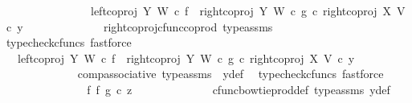 \begin{isabellebody}
\ \ \ \ \ \ \ \ \ \ \ \ \ \ \ \ {\isacharparenleft}{\kern0pt}{\isacharparenleft}{\kern0pt}{\isacharparenleft}{\kern0pt}left{\isacharunderscore}{\kern0pt}coproj\ Y\ W\ {\isasymcirc}\isactrlsub c\ f{\isacharparenright}{\kern0pt}\ {\isasymamalg}\ {\isacharparenleft}{\kern0pt}right{\isacharunderscore}{\kern0pt}coproj\ Y\ W\ {\isasymcirc}\isactrlsub c\ g{\isacharparenright}{\kern0pt}{\isacharparenright}{\kern0pt}\ {\isasymcirc}\isactrlsub c\ right{\isacharunderscore}{\kern0pt}coproj\ X\ V{\isacharparenright}{\kern0pt}\ {\isasymcirc}\isactrlsub c\ y{}{\isachardoublequoteclose}\isanewline
\ \ \ \ \ \ \ \ \ \ \ \ \isamarkupfalse%
\ right{\isacharunderscore}{\kern0pt}coproj{\isacharunderscore}{\kern0pt}cfunc{\isacharunderscore}{\kern0pt}coprod\ type{\isacharunderscore}{\kern0pt}assms\ \isamarkupfalse%
\ {\isacharparenleft}{\kern0pt}typecheck{\isacharunderscore}{\kern0pt}cfuncs{\isacharcomma}{\kern0pt}\ fastforce{\isacharparenright}{\kern0pt}\isanewline
\ \ \ \ \ \ \ \ \ \ \isamarkupfalse%
\ \isamarkupfalse%
\ {\isachardoublequoteopen}{\isachardot}{\kern0pt}{\isachardot}{\kern0pt}{\isachardot}{\kern0pt}\ {\isacharequal}{\kern0pt}\ {\isacharparenleft}{\kern0pt}{\isacharparenleft}{\kern0pt}left{\isacharunderscore}{\kern0pt}coproj\ Y\ W\ {\isasymcirc}\isactrlsub c\ f{\isacharparenright}{\kern0pt}\ {\isasymamalg}\ {\isacharparenleft}{\kern0pt}right{\isacharunderscore}{\kern0pt}coproj\ Y\ W\ {\isasymcirc}\isactrlsub c\ g{\isacharparenright}{\kern0pt}{\isacharparenright}{\kern0pt}\ {\isasymcirc}\isactrlsub c\ right{\isacharunderscore}{\kern0pt}coproj\ X\ V\ {\isasymcirc}\isactrlsub c\ y{}{\isachardoublequoteclose}\isanewline
\ \ \ \ \ \ \ \ \ \ \ \ \isamarkupfalse%
\ comp{\isacharunderscore}{\kern0pt}associative{}\ type{\isacharunderscore}{\kern0pt}assms\ \ y{}{\isacharunderscore}{\kern0pt}def\ \isamarkupfalse%
\ {\isacharparenleft}{\kern0pt}typecheck{\isacharunderscore}{\kern0pt}cfuncs{\isacharcomma}{\kern0pt}\ fastforce{\isacharparenright}{\kern0pt}\isanewline
\ \ \ \ \ \ \ \ \ \ \isamarkupfalse%
\ \isamarkupfalse%
\ {\isachardoublequoteopen}{\isachardot}{\kern0pt}{\isachardot}{\kern0pt}{\isachardot}{\kern0pt}\ {\isacharequal}{\kern0pt}\ {\isacharparenleft}{\kern0pt}f\ {\isasymbowtie}\isactrlsub f\ g{\isacharparenright}{\kern0pt}\ {\isasymcirc}\isactrlsub c\ z{}{\isachardoublequoteclose}\isanewline
\ \ \ \ \ \ \ \ \ \ \ \ \isamarkupfalse%
\ cfunc{\isacharunderscore}{\kern0pt}bowtie{\isacharunderscore}{\kern0pt}prod{\isacharunderscore}{\kern0pt}def{}\ type{\isacharunderscore}{\kern0pt}assms\ y{}{\isacharunderscore}{\kern0pt}def\ \isamarkupfalse%

\end{isabellebody}
